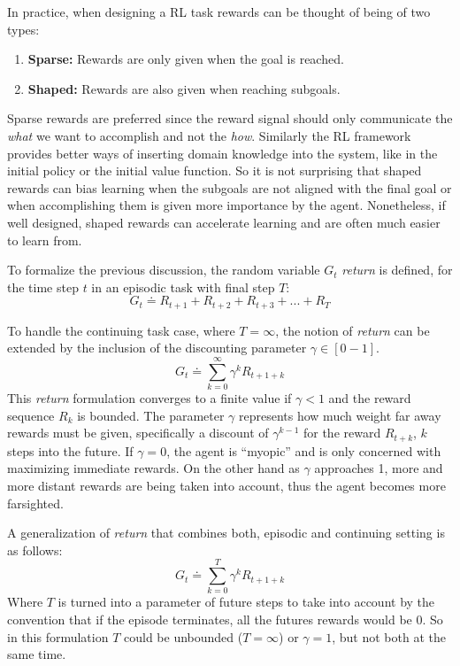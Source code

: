 \documentclass[
  openany]{book}
\providecommand{\tightlist}{%
  \setlength{\itemsep}{0pt}\setlength{\parskip}{0pt}}
\begin{document}
In practice, when designing a RL task rewards can be thought of being of two types:

\begin{enumerate}
\def\labelenumi{\arabic{enumi}.}
\tightlist
\item
  \textbf{Sparse:} Rewards are only given when the goal is reached.
\item
  \textbf{Shaped:} Rewards are also given when reaching subgoals.
\end{enumerate}

Sparse rewards are preferred since the reward signal should only communicate the \emph{what} we want to accomplish and not the \emph{how}. Similarly the RL framework provides better ways of inserting domain knowledge into the system, like in the initial policy or the initial value function. So it is not surprising that shaped rewards can bias learning when the subgoals are not aligned with the final goal or when accomplishing them is given more importance by the agent. Nonetheless, if well designed, shaped rewards can accelerate learning and are often much easier to learn from.

To formalize the previous discussion, the random variable \(G_t\) \emph{return} is defined, for the time step \(t\) in an episodic task with final step \(T\):
\[ G_t \doteq R_{t+1} + R_{t+2} + R_{t+3} + ... + R_{T}\]

To handle the continuing task case, where \(T=\infty\), the notion of \emph{return} can be extended by the inclusion of the discounting parameter \(\gamma \in [0-1]\).
\[G_t \doteq \sum_{k=0}^{\infty} \gamma^k R_{t+1+k}\]
This \emph{return} formulation converges to a finite value if \(\gamma < 1\) and the reward sequence \(R_k\) is bounded. The parameter \(\gamma\) represents how much weight far away rewards must be given, specifically a discount of \(\gamma^{k-1}\) for the reward \(R_{t+k}\), \(k\) steps into the future. If \(\gamma = 0\), the agent is ``myopic'' and is only concerned with maximizing immediate rewards. On the other hand as \(\gamma\) approaches 1, more and more distant rewards are being taken into account, thus the agent becomes more farsighted.

A generalization of \emph{return} that combines both, episodic and continuing setting is as follows:
\[G_t \doteq \sum_{k=0}^{T} \gamma^k R_{t+1+k}\]
Where \(T\) is turned into a parameter of future steps to take into account by the convention that if the episode terminates, all the futures rewards would be \(0\). So in this formulation \(T\) could be unbounded (\(T = \infty\)) or \(\gamma = 1\), but not both at the same time.
\end{document}
